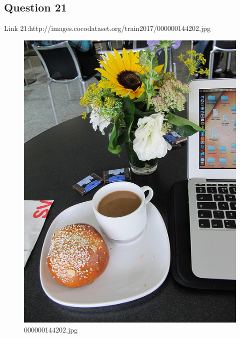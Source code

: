 \subsection*{Question 21}
Link 21:http://images.cocodataset.org/train2017/000000144202.jpg
    \begin{figure}[h]
        \centering
        \includegraphics[width=0.8\linewidth]{../image set/easy/000000144202.jpg}
        \caption{000000144202.jpg}
    \end{figure}
